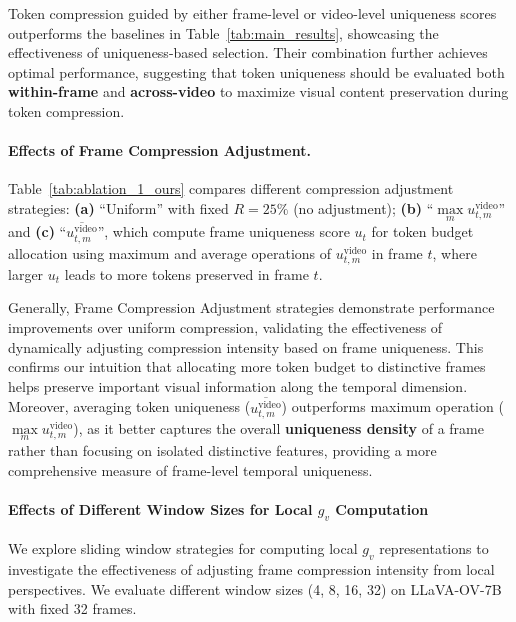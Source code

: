 Token compression guided by either frame-level or video-level uniqueness scores outperforms the baselines in Table~\ref{tab:main_results}, showcasing the effectiveness of uniqueness-based selection. Their combination further achieves optimal performance, suggesting that token uniqueness should be evaluated both \textbf{within-frame} and \textbf{across-video} to maximize visual content preservation during token compression.




\paragraph{Effects of Frame Compression Adjustment.} Table~\ref{tab:ablation_1_ours} compares different compression adjustment strategies: \textbf{(a)} ``Uniform'' with fixed $R=25\%$ (no adjustment); \textbf{(b)} ``$\max\limits_{m} u^\mathrm{video}_{t,m}$'' and \textbf{(c)} ``$\overline{u^\mathrm{video}_{t,m}}$'', which compute frame uniqueness score $u_t$ for token budget allocation using maximum and average operations of $u^\mathrm{video}_{t,m}$ in frame $t$, where larger $u_t$ leads to more tokens preserved in frame $t$.

Generally, Frame Compression Adjustment strategies demonstrate performance improvements over uniform compression, validating the effectiveness of dynamically adjusting compression intensity based on frame uniqueness. This confirms our intuition that allocating more token budget to distinctive frames helps preserve important visual information along the temporal dimension. Moreover, averaging token uniqueness ($\overline{u^\mathrm{video}_{t,m}}$) outperforms maximum operation ($\max\limits_{m} u^\mathrm{video}_{t,m}$), as it better captures the overall \textbf{uniqueness density} of a frame rather than focusing on isolated distinctive features, providing a more comprehensive measure of frame-level temporal uniqueness.



\paragraph{Effects of Different Window Sizes for Local $g_v$ Computation}
We explore sliding window strategies for computing local $g_v$ representations to investigate the effectiveness of adjusting frame compression intensity from local perspectives. We evaluate different window sizes (4, 8, 16, 32) on LLaVA-OV-7B with fixed 32 frames.

